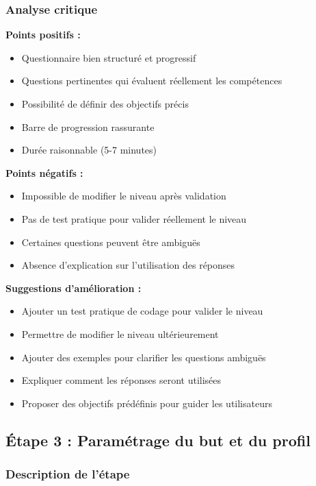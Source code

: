 \documentclass[12pt,a4paper]{article}
\begin{document}
\subsubsection{Analyse critique}

\textbf{Points positifs :}
\begin{itemize}
    \item Questionnaire bien structuré et progressif
    \item Questions pertinentes qui évaluent réellement les compétences
    \item Possibilité de définir des objectifs précis
    \item Barre de progression rassurante
    \item Durée raisonnable (5-7 minutes)
\end{itemize}

\textbf{Points négatifs :}
\begin{itemize}
    \item Impossible de modifier le niveau après validation
    \item Pas de test pratique pour valider réellement le niveau
    \item Certaines questions peuvent être ambiguës
    \item Absence d'explication sur l'utilisation des réponses
\end{itemize}

\textbf{Suggestions d'amélioration :}
\begin{itemize}
    \item Ajouter un test pratique de codage pour valider le niveau
    \item Permettre de modifier le niveau ultérieurement
    \item Ajouter des exemples pour clarifier les questions ambiguës
    \item Expliquer comment les réponses seront utilisées
    \item Proposer des objectifs prédéfinis pour guider les utilisateurs
\end{itemize}

\subsection{Étape 3 : Paramétrage du but et du profil}

\subsubsection{Description de l'étape}
\end{document}
